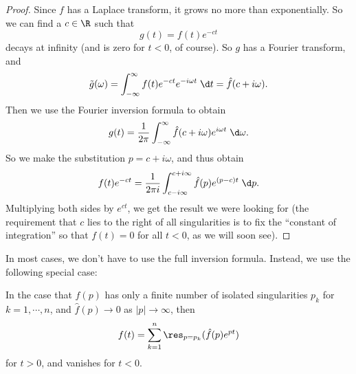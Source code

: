 \documentclass[a4paper]{article}
\begin{document}
\begin{proof}
  Since $f$ has a Laplace transform, it grows no more than exponentially. So we can find a $c \in \R$ such that
  \[
    g(t) = f(t) e^{-ct}
  \]
  decays at infinity (and is zero for $t < 0$, of course). So $g$ has a Fourier transform, and
  \[
    \tilde{g}(\omega) = \int_{-\infty}^\infty f(t) e^{-ct} e^{-i\omega t}\;\d t= \hat{f}(c + i\omega).
  \]
  Then we use the Fourier inversion formula to obtain
  \[
    g(t) = \frac{1}{2\pi} \int_{-\infty}^\infty \hat{f}(c+ i\omega) e^{i\omega t}\;\d \omega.
  \]
  So we make the substitution $p = c + i\omega$, and thus obtain
  \[
    f(t) e^{-ct} = \frac{1}{2 \pi i} \int_{c - i\infty}^{c + i\infty} \hat{f}(p) e^{(p - c)t}\;\d p.
  \]
  Multiplying both sides by $e^{ct}$, we get the result we were looking for (the requirement that $c$ lies to the right of all singularities is to fix the ``constant of integration'' so that $f(t) = 0$ for all $t < 0$, as we will soon see).
\end{proof}
In most cases, we don't have to use the full inversion formula. Instead, we use the following special case:
\begin{prop}
  In the case that $\hat{f}(p)$ has only a finite number of isolated singularities $p_k$ for $k = 1, \cdots, n$, and $\hat{f}(p) \to 0$ as $|p| \to \infty$, then
  \[
    f(t) = \sum_{k = 1}^n \res_{p = p_k} (\hat{f}(p) e^{pt})
  \]
  for $t > 0$, and vanishes for $t < 0$.
\end{prop}
\end{document}
